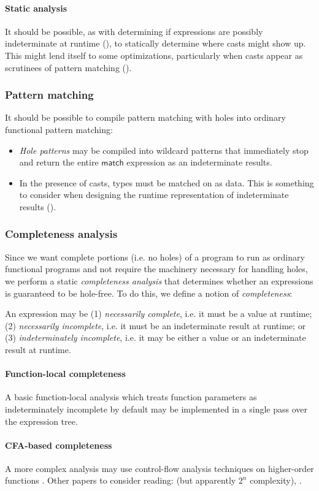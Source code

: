 \documentclass[index.tex]{subfiles}
\begin{document}
\paragraph{Static analysis}
It should be possible, as with determining if expressions are possibly indeterminate at runtime
(), to statically determine where casts might show up. This might lend
itself to some optimizations, particularly when casts appear as scrutinees of pattern matching
().

\subsubsection{Pattern matching}
\label{pattern-matching}
It should be possible to compile pattern matching with holes into ordinary functional pattern
matching:
\begin{itemize}
  \item \emph{Hole patterns} may be compiled into wildcard patterns that immediately stop and return
    the entire $\textsf{match}$ expression as an indeterminate results.
  \item In the presence of casts, types must be matched on as data. This is something to consider
    when designing the runtime representation of indeterminate results
    ().
\end{itemize}

\subsubsection{Completeness analysis}
\label{completeness-analysis}
Since we want complete portions (i.e. no holes) of a program to run as ordinary functional programs
and not require the machinery necessary for handling holes, we perform a static \emph{completeness
analysis} that determines whether an expressions is guaranteed to be hole-free. To do this, we
define a notion of \emph{completeness}:
%
\begin{definition}[name=Completeness]
  An expression may be (1) \emph{necessarily complete}, i.e. it must be a value at runtime; (2)
  \emph{necessarily incomplete}, i.e. it must be an indeterminate result at runtime; or (3)
  \emph{indeterminately incomplete}, i.e. it may be either a value or an indeterminate result at
  runtime.
\end{definition}
%

\paragraph{Function-local completeness}
A basic function-local analysis which treats function parameters as indeterminately
incomplete by default may be implemented in a single pass over the expression tree.

\paragraph{CFA-based completeness}
A more complex analysis may use control-flow analysis techniques on higher-order functions
\cite{shivers1991, nielson1999}. Other papers to consider reading: \textcite{vardoulaskis2011} (but
apparently $2^{n}$ complexity), \textcite{gilray2016}.
\end{document}
